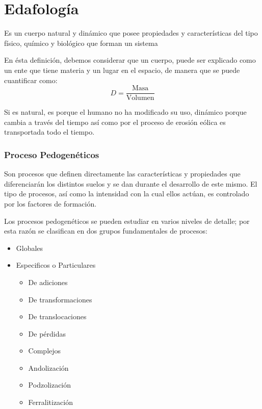 \chapter{Edafología}
\begin{definition}[Suelo]
    Es un cuerpo natural y dinámico que posee propiedades y características del tipo físico, químico y biológico que forman un sistema
\end{definition}
En ésta definición, debemos considerar que un cuerpo, puede ser explicado como un ente que tiene materia y un lugar en el espacio, de manera que se puede cuantificar como:
\begin{equation}
    D = \frac{\text{Masa}}{\text{Volumen}}
\end{equation}

Si es natural, es porque el humano no ha modificado su uso, dinámico porque cambia a través del tiempo así como por el proceso de erosión eólica es transportada todo el tiempo.

\subsection{Proceso Pedogenéticos}

Son procesos que definen directamente las características y propiedades que diferenciarán los distintos suelos y se dan durante el desarrollo de este mismo. El tipo de procesos, así como la intensidad con la cual ellos actúan, es controlado por los factores de formación.

Los procesos pedogenéticos se pueden estudiar en varios niveles de detalle; por esta razón se clasifican en dos grupos fundamentales de procesos:

\begin{itemize}
    \item Globales
    \item Especificos o Particulares\begin{itemize}
        \item De adiciones
\item De transformaciones
\item De translocaciones
\item De pérdidas
\item Complejos
\item Andolización
\item Podzolización
\item Ferralitización
    \end{itemize}
\end{itemize}

